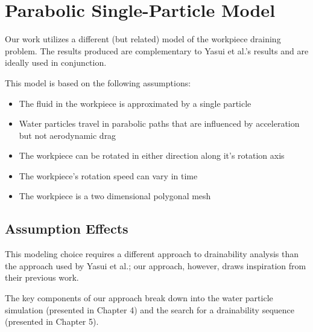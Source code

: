 


\section{Parabolic Single-Particle Model}

Our work utilizes a different (but related) model of the workpiece draining problem. The results produced are complementary to Yasui et al.'s results and are ideally used in conjunction.

This model is based on the following assumptions:

\begin{itemize}
	\item The fluid in the workpiece is approximated by a single particle
	\item Water particles travel in parabolic paths that are influenced by acceleration but not aerodynamic drag
	\item The workpiece can be rotated in either direction along it's rotation axis
	\item The workpiece's rotation speed can vary in time
	\item The workpiece is a two dimensional polygonal mesh
\end{itemize}

	\subsection{Assumption Effects}

This modeling choice requires a different approach to drainability analysis than the approach used by Yasui et al.; our approach, however, draws inspiration from their previous work.

The key components of our approach break down into the water particle simulation (presented in Chapter 4) and the search for a drainability sequence (presented in Chapter 5).



